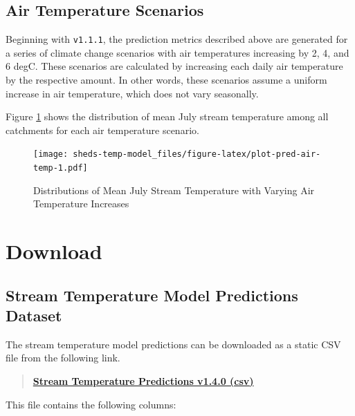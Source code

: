 \documentclass[
]{book}
\begin{document}
\section{Air Temperature Scenarios}\label{air-temperature-scenarios}

Beginning with \texttt{v1.1.1}, the prediction metrics described above are generated for a series of climate change scenarios with air temperatures increasing by 2, 4, and 6 degC. These scenarios are calculated by increasing each daily air temperature by the respective amount. In other words, these scenarios assume a uniform increase in air temperature, which does not vary seasonally.

Figure \ref{fig:plot-pred-air-temp} shows the distribution of mean July stream temperature among all catchments for each air temperature scenario.

\begin{figure}
\centering
\texttt{[image: sheds-temp-model\_files/figure-latex/plot-pred-air-temp-1.pdf]}
\caption{\label{fig:plot-pred-air-temp}Distributions of Mean July Stream Temperature with Varying Air Temperature Increases}
\end{figure}

\chapter{Download}\label{download}

\section{Stream Temperature Model Predictions Dataset}\label{stream-temperature-model-predictions-dataset}

The stream temperature model predictions can be downloaded as a static CSV file from the following link.

\begin{quote}
\textbf{\href{https://ecosheds.s3.amazonaws.com/northeast-temp-model/output/sheds-temp-model-v1.4.0.csv}{Stream Temperature Predictions v1.4.0 (csv)}}
\end{quote}

This file contains the following columns:
\end{document}
